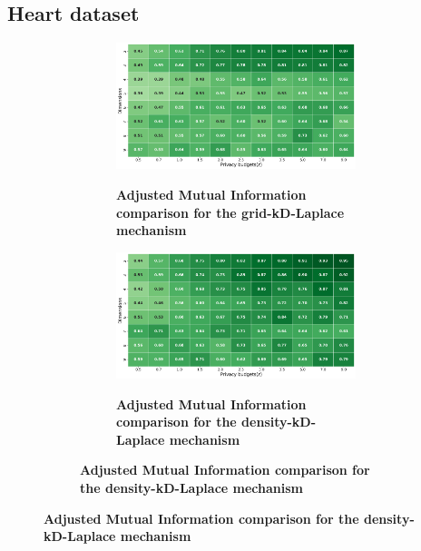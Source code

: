 \subsection{Heart dataset} \label{appendix:results-mechanism-utility-heart-dataset}
\begin{figure}[H]
    \centering
    \begin{subfigure}[b]{0.90\textwidth}
        \begin{subfigure}[c]{1\textwidth}
            \caption{\textbf{Adjusted Mutual Information comparison for the grid-kD-Laplace mechanism}}
            \includegraphics[width=1\textwidth]{Results/kd-laplace/grid-kd-Laplace/heart-dataset/ami.png}
            \label{fig:ami_heart-dataset_comparison_grid-kd_2d}
        \end{subfigure}
        \vfill %
        \begin{subfigure}[c]{1\textwidth}
            \caption{\textbf{Adjusted Mutual Information comparison for the density-kD-Laplace mechanism}}
            \includegraphics[width=1\textwidth]{Results/kd-laplace/density-kd-Laplace/heart-dataset/ami.png}
            \label{fig:ami_heart-dataset_comparison_density-kd_2d}
        \end{subfigure}

\end{subfigure}
\end{figure}

